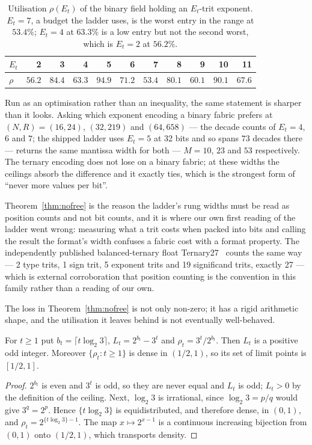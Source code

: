 \begin{table}[t]\centering
\caption{Utilisation $\rho(E_t)$ of the binary field holding an $E_t$-trit
exponent. $E_t = 7$, a budget the ladder uses, is the worst entry in the range at
$53.4\%$; $E_t = 4$ at $63.3\%$ is a low entry but not the second worst, which is
$E_t = 2$ at $56.2\%$.}
\label{tab:rho}
\begin{tabular}{lrrrrrrrrrr}
\toprule
$E_t$ & 2 & 3 & 4 & 5 & 6 & 7 & 8 & 9 & 10 & 11 \\
\midrule
$\rho$ & $56.2$ & $84.4$ & $\mathbf{63.3}$ & $94.9$ & $71.2$ & $\mathbf{53.4}$ & $80.1$ & $60.1$ & $90.1$ & $67.6$ \\
\bottomrule
\end{tabular}
\end{table}

Run as an optimisation rather than an inequality, the same statement is sharper
than it looks. Asking which exponent encoding a binary fabric prefers at
$(N, R) = (16, 24)$, $(32, 219)$ and $(64, 658)$ --- the decade counts of
$E_t = 4$, $6$ and $7$; the shipped ladder uses $E_t = 5$ at 32 bits and so spans
$73$ decades there --- returns the same mantissa width
for both --- $M = 10$, $23$ and $53$ respectively. The ternary encoding does not
lose on a binary fabric; at these widths the ceilings absorb the difference and it
exactly ties, which is the strongest form of ``never more values per bit''.

Theorem~\ref{thm:nofree} is the reason the ladder's rung widths must be read as
position counts and not bit counts, and it is where our own first reading of the
ladder went wrong: measuring what a trit costs when packed into bits and calling
the result the format's width confuses a fabric cost with a format property. The
independently published balanced-ternary float Ternary27~\cite{ternary27} counts
the same way --- 2 type trits, 1 sign trit, 5 exponent trits and 19 significand
trits, exactly 27 --- which is external corroboration that position counting is
the convention in this family rather than a reading of our own.

The loss in Theorem~\ref{thm:nofree} is not only non-zero; it has a rigid
arithmetic shape, and the utilisation it leaves behind is not eventually
well-behaved.

\begin{theorem}
\label{thm:packing-density}
For $t\geq1$ put $b_t=\lceil t\log_2 3\rceil$, $L_t=2^{b_t}-3^{t}$ and
$\rho_t=3^{t}/2^{b_t}$. Then $L_t$ is a positive odd integer. Moreover
$\{\rho_t : t\geq1\}$ is dense in $(1/2,1)$, so its set of limit points is
$[1/2,1]$.
\end{theorem}
\begin{proof}
$2^{b_t}$ is even and $3^{t}$ is odd, so they are never equal and $L_t$ is odd;
$L_t>0$ by the definition of the ceiling. Next, $\log_2 3$ is irrational, since
$\log_2 3=p/q$ would give $3^{q}=2^{p}$. Hence $\{t\log_2 3\}$ is
equidistributed, and therefore dense, in $(0,1)$, and
$\rho_t=2^{\{t\log_2 3\}-1}$. The map $x\mapsto2^{x-1}$ is a continuous
increasing bijection from $(0,1)$ onto $(1/2,1)$, which transports density.
\end{proof}

